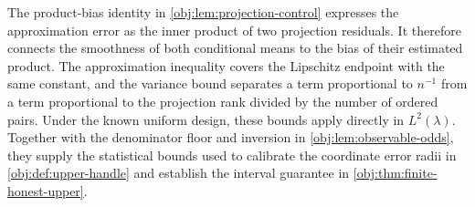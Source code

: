 The product-bias identity in \cref{obj:lem:projection-control} expresses the approximation error as the inner product of two projection residuals. It therefore connects the smoothness of both conditional means to the bias of their estimated product. The approximation inequality covers the Lipschitz endpoint with the same constant, and the variance bound separates a term proportional to \(n^{-1}\) from a term proportional to the projection rank divided by the number of ordered pairs. Under the known uniform design, these bounds apply directly in \(L^2(\lambda)\). Together with the denominator floor and inversion in \cref{obj:lem:observable-odds}, they supply the statistical bounds used to calibrate the coordinate error radii in \cref{obj:def:upper-handle} and establish the interval guarantee in \cref{obj:thm:finite-honest-upper}.
